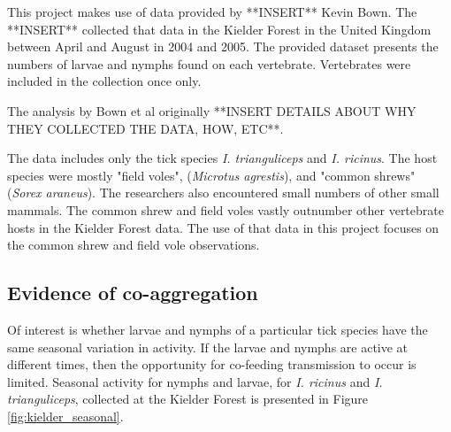 \documentclass{article}
\begin{document}
This project makes use of data provided by **INSERT** Kevin Bown. The **INSERT** collected that data in the Kielder Forest in the United Kingdom between April and August in 2004 and 2005. The provided dataset presents the numbers of larvae and nymphs found on each vertebrate. Vertebrates were included in the collection once only.

The analysis by Bown et al originally **INSERT DETAILS ABOUT WHY THEY COLLECTED THE DATA, HOW, ETC**.

The data includes only the tick species \textit{I. trianguliceps} and  \textit{I. ricinus}. The host species were mostly "field voles", (\textit{Microtus agrestis}), and "common shrews" (\textit{Sorex araneus}). The researchers also encountered small numbers of other small mammals. The common shrew and field voles vastly outnumber other vertebrate hosts in the Kielder Forest data. The use of that data in this project focuses on the common shrew and field vole observations. 

\subsection{Evidence of co-aggregation}

Of interest is whether larvae and nymphs of a particular tick species have the same seasonal variation in activity. If the larvae and nymphs are active at different times, then the opportunity for co-feeding transmission to occur is limited. Seasonal activity for nymphs and larvae, for \textit{I. ricinus} and \textit{I. trianguliceps}, collected at the Kielder Forest is presented in Figure \ref{fig:kielder_seasonal}.
\end{document}
